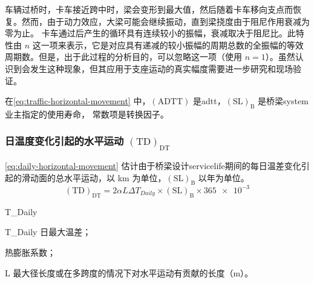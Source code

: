 车辆过桥时，卡车接近跨中时，梁会变形到最大值，然后随着卡车移向支点而恢复。然而，由于动力效应，大梁可能会继续振动，直到梁挠度由于阻尼作用衰减为零为止。 卡车通过后产生的循环具有连续较小的振幅，衰减取决于阻尼比。此特性由 $n$ 这一项来表示，它是对应具有递减的较小振幅的周期总数的全振幅的等效周期数。但是，出于此过程的分析目的，可以忽略这一项（使用 $n = 1$）。虽然认识到会发生这种现象，但其应用于支座运动的真实幅度需要进一步研究和现场验证。

在\cref{eq:traffic-horizontal-movement} 中，$(\text{ADTT})$ 是\acrlong*{adtt}，$(\text{SL})_\text{B}$ 是桥梁\gls*{system}业主指定的使用寿命， 常数项是转换因子。

\subsubsection{日温度变化引起的水平运动 $(\text{TD})_\text{DT}$}
\cref{eq:daily-horizontal-movement} 估计由于桥梁设计\gls*{servicelife}期间的每日温差变化引起的滑动面的总水平运动，以 \unit{km} 为单位，$(\text{SL})_\text{B}$ 以年为单位。
\begin{equation}
  \label{eq:daily-horizontal-movement}
  (\text{TD})_\text{DT} = 2 \alpha L \Delta T_{Daily} \times (\text{SL})_\text{B} \times \num{365e-3}
\end{equation}
\begin{EqDesc}{\Delta T_{Daily}}
  \item[\Delta T_{Daily}] 日最大温差；
  \item[\alpha] 热膨胀系数；
  \item[L] 最大径长度或在多跨度的情况下对水平运动有贡献的长度（\unit{m}）。
\end{EqDesc}



